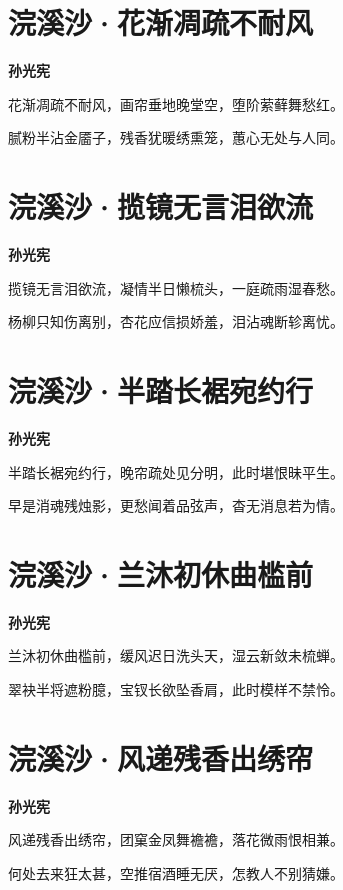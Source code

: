 \documentclass[12pt,a4paper]{ctexbook}
\begin{document}
\section{浣溪沙·花渐凋疏不耐风}
\textbf{孙光宪}\par\vspace{0.5em}
花渐凋疏不耐风，画帘垂地晚堂空，堕阶萦藓舞愁红。\par
腻粉半沾金靥子，残香犹暖绣熏笼，蕙心无处与人同。\par

\section{浣溪沙·揽镜无言泪欲流}
\textbf{孙光宪}\par\vspace{0.5em}
揽镜无言泪欲流，凝情半日懒梳头，一庭疏雨湿春愁。\par
杨柳只知伤离别，杏花应信损娇羞，泪沾魂断轸离忧。\par

\section{浣溪沙·半踏长裾宛约行}
\textbf{孙光宪}\par\vspace{0.5em}
半踏长裾宛约行，晚帘疏处见分明，此时堪恨昧平生。\par
早是消魂残烛影，更愁闻着品弦声，杳无消息若为情。\par

\section{浣溪沙·兰沐初休曲槛前}
\textbf{孙光宪}\par\vspace{0.5em}
兰沐初休曲槛前，缓风迟日洗头天，湿云新敛未梳蝉。\par
翠袂半将遮粉臆，宝钗长欲坠香肩，此时模样不禁怜。\par

\section{浣溪沙·风递残香出绣帘}
\textbf{孙光宪}\par\vspace{0.5em}
风递残香出绣帘，团窠金凤舞襜襜，落花微雨恨相兼。\par
何处去来狂太甚，空推宿酒睡无厌，怎教人不别猜嫌。\par
\end{document}
